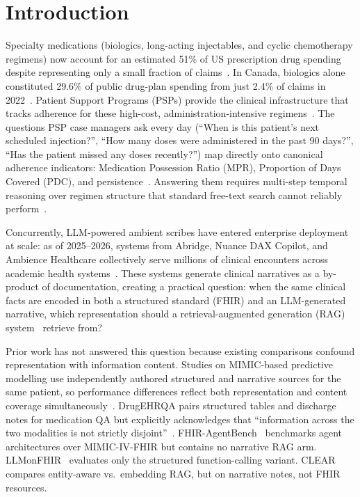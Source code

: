 \section{Introduction}
\label{sec:intro}

Specialty medications (biologics, long-acting injectables, and cyclic chemotherapy
regimens) now account for an estimated 51\% of US prescription drug spending despite
representing only a small fraction of claims~\citep{niu2024specialty}.  In Canada, biologics
alone constituted 29.6\% of public drug-plan spending from just 2.4\% of claims in
2022~\citep{cihi2023prescribed}.  Patient Support Programs (PSPs) provide the clinical
infrastructure that tracks adherence for these high-cost, administration-intensive
regimens~\citep{grundy2023psp}.  The questions PSP case managers ask every day (``When
is this patient's next scheduled injection?'', ``How many doses were administered in the
past 90 days?'', ``Has the patient missed any doses recently?'') map directly onto
canonical adherence indicators: Medication Possession Ratio (MPR), Proportion of Days
Covered (PDC), and persistence~\citep{lociganic2015using}.  Answering them requires
multi-step temporal reasoning over regimen structure that standard free-text search cannot
reliably perform~\citep{yao2024chemotimelines}.

Concurrently, LLM-powered ambient scribes have entered enterprise deployment at scale:
as of 2025--2026, systems from Abridge, Nuance DAX Copilot, and Ambience Healthcare
collectively serve millions of clinical encounters across academic health
systems~\citep{tierney2024ambient,rotenstein2026changes}.  These systems generate clinical
narratives as a by-product of documentation, creating a practical question: when the same
clinical facts are encoded in both a structured standard (FHIR) and an LLM-generated
narrative, which representation should a retrieval-augmented generation (RAG)
system~\citep{lewis2020retrieval} retrieve from?

Prior work has not answered this question because existing comparisons confound
representation with information content.  Studies on MIMIC-based predictive modelling
use independently authored structured and narrative sources for the same patient, so
performance differences reflect both representation and content coverage
simultaneously~\citep{moldwin2021empirical}.  DrugEHRQA pairs structured tables and
discharge notes for medication QA but explicitly acknowledges that ``information across the
two modalities is not strictly disjoint''~\citep{bardhan2022drugehrqa}.
FHIR-AgentBench~\citep{lee2025fhiragentbench} benchmarks agent architectures over
MIMIC-IV-FHIR but contains no narrative RAG arm.  LLMonFHIR~\citep{schmiedmayer2025llmonfhir}
evaluates only the structured function-calling variant.
CLEAR~\citep{lopez2025clinical} compares entity-aware vs.\ embedding RAG, but on
narrative notes, not FHIR resources.


